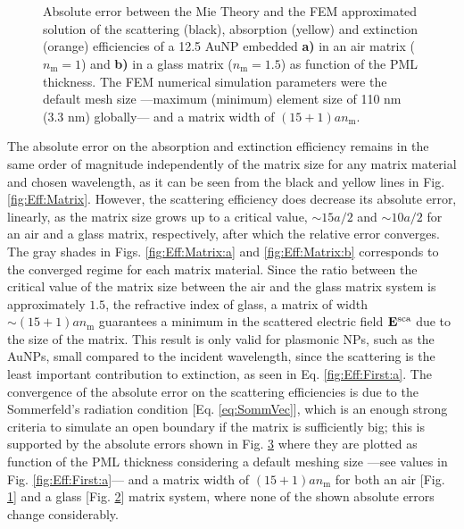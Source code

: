 %
\begin{figure}[b!]
	\centering
	\def\svgwidth{.9\textwidth}
	\small
	\vspace*{.5em}
	\hspace*{-.675\textwidth}
	 \begin{subfigure}{\textwidth}\caption{}\label{fig:Eff:PML:a}\end{subfigure}\\[6.5em]
		 \hspace*{-.675\textwidth}
	      \begin{subfigure}{\textwidth}\caption{}\label{fig:Eff:PML:b}\end{subfigure}\\[-10.5em]
\caption[Scattering, Absorption and Extinction Efficiencies absolute error: PML thickness analysis ]{Absolute error between the Mie Theory and the FEM approximated solution of the scattering (black), absorption (yellow) and extinction (orange) efficiencies of a 12.5 AuNP embedded \textbf{a)} in an air matrix ($n_\text{m} = 1$) and \textbf{b)} in a glass matrix ($n_\text{m} = 1.5$) as function of the PML thickness. The FEM numerical simulation parameters were the default mesh size ---maximum (minimum) element size of 110 nm (3.3 nm) globally--- and a matrix width of $(15+1) a n_\text{m}$.}
\label{fig:Eff:PML}
\end{figure}

The absolute error on the absorption and extinction efficiency remains in the same order of magnitude independently of the matrix size for any matrix material and chosen wavelength, as it can be seen from the black and yellow lines in Fig. \ref{fig:Eff:Matrix}. However, the scattering efficiency does decrease its absolute error, linearly, as the matrix size grows  up to a critical value, $\sim 15 a/2$ and $\sim 10 a/2$ for an air and a glass matrix, respectively, after which the relative error converges. The gray shades in Figs. \ref{fig:Eff:Matrix:a}  and \ref{fig:Eff:Matrix:b} corresponds to the converged regime for each matrix material. Since the ratio between the critical value of the matrix size between the air  and the glass matrix system is approximately $1.5$, the refractive index of glass, a matrix of width $\sim (15+1) a n_\text{m}$ guarantees a minimum in the scattered electric field $\vb{E}^\text{sca}$ due to the size of the matrix. This result is only valid for plasmonic NPs, such as the AuNPs, small compared to the incident wavelength, since the scattering is the least important contribution to extinction, as seen in Eq. \ref{fig:Eff:First:a}. The convergence of the absolute error on the scattering efficiencies is due to the Sommerfeld's radiation condition [Eq. \eqref{eq:SommVec}], which is an enough strong criteria to simulate an open boundary if the matrix is sufficiently big; this is supported by the absolute errors shown in Fig. \ref{fig:Eff:PML} where they are plotted as function of the PML thickness considering a default meshing size ---see values in Fig. \ref{fig:Eff:First:a}--- and a matrix width of  $(15+1) a n_\text{m}$ for both an air [Fig. \ref{fig:Eff:PML:a}] and a glass [Fig. \ref{fig:Eff:PML:b}] matrix system, where none of the shown absolute errors change considerably.

